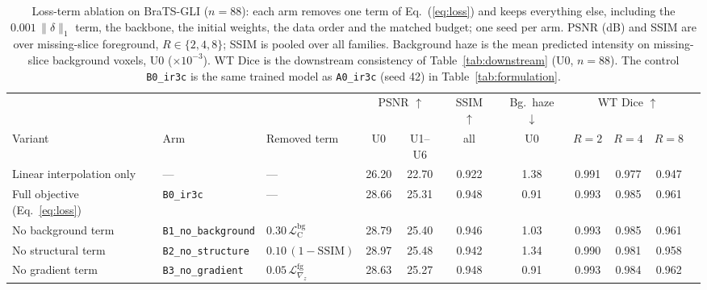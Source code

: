\begin{table}[pos=t]
\caption{Loss-term ablation on BraTS-GLI ($n=88$): each arm removes one term of Eq.~(\ref{eq:loss}) and keeps everything else, including the $0.001\,\lVert\delta\rVert_1$ term, the backbone, the initial weights, the data order and the matched budget; one seed per arm. PSNR (dB) and SSIM are over missing-slice foreground, $R\in\{2,4,8\}$; SSIM is pooled over all families. Background haze is the mean predicted intensity on missing-slice background voxels, U0 ($\times10^{-3}$). WT Dice is the downstream consistency of Table~\ref{tab:downstream} (U0, $n=88$). The control \texttt{B0\_ir3c} is the same trained model as \texttt{A0\_ir3c} (seed 42) in Table~\ref{tab:formulation}.}
\label{tab:loss}
\small
\begin{tabular*}{\textwidth}{@{\extracolsep{\fill}}lllcccccccc@{}}
\toprule
& & & \multicolumn{2}{c}{PSNR $\uparrow$} & SSIM $\uparrow$ & Bg.\ haze $\downarrow$ & \multicolumn{3}{c}{WT Dice $\uparrow$} \\
\cmidrule(lr){4-5}\cmidrule(lr){8-10}
Variant & Arm & Removed term & U0 & U1--U6 & all & U0 & $R=2$ & $R=4$ & $R=8$ \\
\midrule
Linear interpolation only & --- & --- & 26.20 & 22.70 & 0.922 & 1.38 & 0.991 & 0.977 & 0.947 \\
Full objective (Eq.~\ref{eq:loss}) & \texttt{B0\_ir3c} & --- & 28.66 & 25.31 & 0.948 & 0.91 & 0.993 & 0.985 & 0.961 \\
No background term & \texttt{B1\_no\_background} & $0.30\,\mathcal{L}_{\mathrm{C}}^{\mathrm{bg}}$ & 28.79 & 25.40 & 0.946 & 1.03 & 0.993 & 0.985 & 0.961 \\
No structural term & \texttt{B2\_no\_structure} & $0.10\,(1-\mathrm{SSIM})$ & 28.97 & 25.48 & 0.942 & 1.34 & 0.990 & 0.981 & 0.958 \\
No gradient term & \texttt{B3\_no\_gradient} & $0.05\,\mathcal{L}_{\nabla_z}^{\mathrm{fg}}$ & 28.63 & 25.27 & 0.948 & 0.91 & 0.993 & 0.984 & 0.962 \\
\bottomrule
\end{tabular*}
\end{table}
